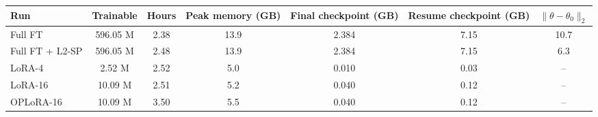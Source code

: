 \begin{tabular}{lcccccc}\toprule Run & Trainable & Hours & Peak memory (GB) & Final checkpoint (GB) & Resume checkpoint (GB) & $\lVert\theta-\theta_0\rVert_2$ \\ \midrule
Full FT & 596.05 M & 2.38 & 13.9 & 2.384 & 7.15 & 10.7 \\
Full FT + L2-SP & 596.05 M & 2.48 & 13.9 & 2.384 & 7.15 & 6.3 \\
LoRA-4 & 2.52 M & 2.52 & 5.0 & 0.010 & 0.03 & -- \\
LoRA-16 & 10.09 M & 2.51 & 5.2 & 0.040 & 0.12 & -- \\
OPLoRA-16 & 10.09 M & 3.50 & 5.5 & 0.040 & 0.12 & -- \\
\bottomrule\end{tabular}
